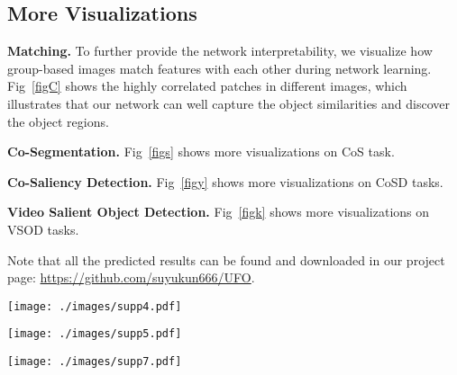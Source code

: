 \documentclass[journal]{IEEEtran}
\begin{document}
\subsection{More Visualizations}

\noindent \textbf{Matching.}
To further provide the network interpretability, we visualize how group-based images match features with each other during network learning.
Fig~\ref{figC} shows the highly correlated patches in different images, which illustrates that our network can well capture the object similarities and discover the object regions. 

\vspace{1ex}

\noindent \textbf{Co-Segmentation.}
Fig~\ref{figs} shows more visualizations on CoS task.

\vspace{1ex}

\noindent \textbf{Co-Saliency Detection.}
Fig~\ref{figy} shows more visualizations on CoSD tasks.

\vspace{1ex}

\noindent \textbf{Video Salient Object Detection.}
Fig~\ref{figk} shows more visualizations on VSOD tasks.

\vspace{1ex}

\noindent Note that all the predicted results can be found and downloaded in our project page: \url{https://github.com/suyukun666/UFO}.

\begin{figure*}[t]
		\begin{center}
			\centering
			\texttt{[image: ./images/supp4.pdf]}
		\end{center}
		\caption{\textbf{Visualizations of co-segmentation}.}
		\label{figs}
\end{figure*}

\begin{figure*}[t]
		\begin{center}
			\centering
			\texttt{[image: ./images/supp5.pdf]}
		\end{center}
		\caption{\textbf{Visualizations of co-saliency detection}.}
		\label{figy}
\end{figure*}

\begin{figure*}[t]
		\begin{center}
			\centering
			\texttt{[image: ./images/supp7.pdf]}
		\end{center}
		\caption{\textbf{Visualizations of video salient object detection}.}
		\label{figk}
\end{figure*}
\end{document}
